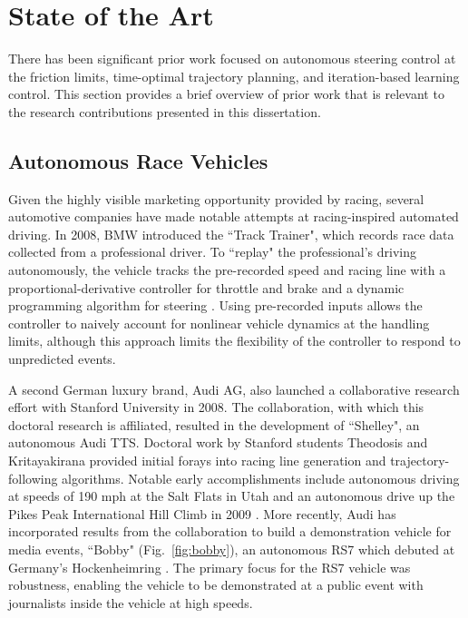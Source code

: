 \section{State of the Art}
\label{sec:soa}

There has been significant prior work focused on autonomous steering control at the friction limits, time-optimal trajectory planning, and
iteration-based learning control. This section provides a brief overview of prior work that is relevant to the research contributions presented in this dissertation.

\subsection{Autonomous Race Vehicles}
\label{sec:arv}
Given the highly visible marketing opportunity provided by racing, 
several automotive companies have made notable attempts at racing-inspired 
automated driving. In 2008, BMW introduced the ``Track Trainer", which records race data
collected from a professional driver. To ``replay" the professional's driving autonomously,
the vehicle tracks the pre-recorded speed and racing line with a proportional-derivative
controller for throttle and brake and a dynamic programming algorithm for steering \cite{ttrain}. 
Using pre-recorded inputs allows the controller to naively account for nonlinear vehicle dynamics
at the handling limits, although this approach limits the flexibility of the controller to respond to unpredicted events. 

A second German luxury brand, Audi AG, also launched a collaborative research effort with Stanford University in 2008. 
The collaboration, with which this doctoral research is affiliated, resulted in the development of ``Shelley", an autonomous Audi TTS. Doctoral work by Stanford
 students Theodosis \cite{paulthesis} and Kritayakirana \cite{mickthesis} provided initial forays into 
 racing line generation and trajectory-following algorithms. Notable early accomplishments include autonomous driving
at speeds of 190 mph at the Salt Flats in Utah and an autonomous drive up the Pikes Peak International Hill Climb in 2009 \cite{ppeak}\cite{saltflats}. 
More recently, Audi has incorporated results from the collaboration to build a demonstration vehicle for media events, ``Bobby" (Fig.~\ref{fig:bobby}), 
an autonomous RS7 which debuted at Germany's Hockenheimring \cite{hocky}. The primary focus for the RS7 vehicle was robustness,
enabling the vehicle to be demonstrated at a public event with journalists inside the vehicle at high speeds. 	

